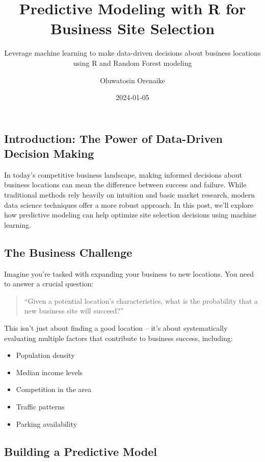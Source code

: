 \documentclass[
  letterpaper,
  DIV=11,
  numbers=noendperiod]{scrartcl}
\title{Predictive Modeling with R for Business Site Selection}
\subtitle{Leverage machine learning to make data-driven decisions about
business locations using R and Random Forest modeling}
\author{Oluwatosin Orenaike}
\date{2024-01-05}
\providecommand{\tightlist}{%
  \setlength{\itemsep}{0pt}\setlength{\parskip}{0pt}}\usepackage{longtable,booktabs,array}
\renewcommand*\contentsname{Table of contents}
\newcommand\contentsname{Table of contents}
\begin{document}
\maketitle

\renewcommand*\contentsname{Table of contents}
{
\hypersetup{linkcolor=}
\setcounter{tocdepth}{3}
\tableofcontents
}
\subsection{Introduction: The Power of Data-Driven Decision
Making}\label{introduction-the-power-of-data-driven-decision-making}

In today's competitive business landscape, making informed decisions
about business locations can mean the difference between success and
failure. While traditional methods rely heavily on intuition and basic
market research, modern data science techniques offer a more robust
approach. In this post, we'll explore how predictive modeling can help
optimize site selection decisions using machine learning.

\subsection{The Business Challenge}\label{the-business-challenge}

Imagine you're tasked with expanding your business to new locations. You
need to answer a crucial question:

\begin{quote}
``Given a potential location's characteristics, what is the probability
that a new business site will succeed?''
\end{quote}

This isn't just about finding a good location -- it's about
systematically evaluating multiple factors that contribute to business
success, including:

\begin{itemize}
\tightlist
\item
  Population density
\item
  Median income levels
\item
  Competition in the area
\item
  Traffic patterns
\item
  Parking availability
\end{itemize}

\subsection{Building a Predictive
Model}\label{building-a-predictive-model}
\end{document}
